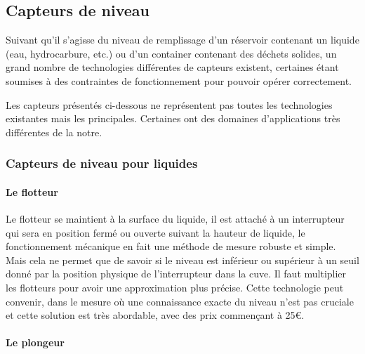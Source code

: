  

\subsection{Capteurs de niveau}

Suivant qu'il s'agisse du niveau de remplissage d'un réservoir contenant un liquide (eau, hydrocarbure, etc.) ou d'un container contenant des déchets solides, un grand nombre de technologies différentes de capteurs existent, certaines étant soumises à des contraintes de fonctionnement pour pouvoir opérer correctement.

Les capteurs présentés ci-dessous ne représentent pas toutes les technologies existantes mais les principales. Certaines ont des domaines d'applications très différentes de la notre.

\subsubsection{Capteurs de niveau pour liquides}

\paragraph{Le flotteur}

Le flotteur se maintient à la surface du liquide, il est attaché à un interrupteur qui sera en position fermé ou ouverte suivant la hauteur de liquide, le fonctionnement mécanique en fait une méthode de mesure robuste et simple. Mais cela ne permet que de savoir si le niveau est inférieur ou supérieur à un seuil donné par la position physique de l'interrupteur dans la cuve. Il faut multiplier les flotteurs pour avoir une approximation plus précise. Cette technologie peut convenir, dans le mesure où une connaissance exacte du niveau n'est pas cruciale et cette solution est très abordable, avec des prix commençant à 25\euro\footnotemark.


\paragraph{Le plongeur}

